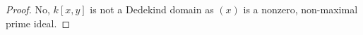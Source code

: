 \begin{proof}
	No, $k[x,y]$ is not a Dedekind domain as $(x)$ is a nonzero, non-maximal prime ideal.
\end{proof}
